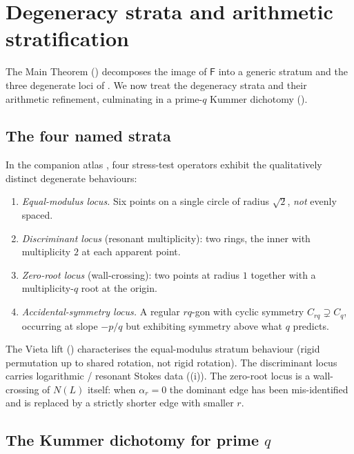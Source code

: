 \documentclass[11pt,a4paper]{article}
\theoremstyle{plain}
\theoremstyle{definition}
\theoremstyle{remark}
\newcommand{\NL}{N(L)}
\newcommand{\Fclass}{\mathsf{F}}
\begin{document}
\section{Degeneracy strata and arithmetic stratification}\label{sec:degeneracy}

The Main Theorem () decomposes the image of $\Fclass$
into a generic stratum and the three degenerate loci of
. We now treat the degeneracy strata and their
arithmetic refinement, culminating in a prime-$q$ Kummer dichotomy
().

\subsection{The four named strata}\label{ssec:strata-named}

In the companion atlas \cite{wkb_dataset_v1}, four stress-test operators
exhibit the qualitatively distinct degenerate behaviours:
\begin{enumerate}[leftmargin=2em]
\item \emph{Equal-modulus locus.} Six points on a single circle of
      radius $\sqrt{2}$, \emph{not} evenly spaced.
\item \emph{Discriminant locus} (resonant multiplicity): two rings, the
      inner with multiplicity $2$ at each apparent point.
\item \emph{Zero-root locus} (wall-crossing): two points at radius $1$
      together with a multiplicity-$q$ root at the origin.
\item \emph{Accidental-symmetry locus.} A regular $rq$-gon with cyclic
      symmetry $C_{rq} \supsetneq C_q$, occurring at slope $-p/q$ but
      exhibiting symmetry above what $q$ predicts.
\end{enumerate}
The Vieta lift () characterises the equal-modulus stratum
behaviour (rigid permutation up to shared rotation, not rigid rotation).
The discriminant locus carries logarithmic / resonant Stokes data
((i)). The zero-root locus is a wall-crossing of
$\NL$ itself: when $\alpha_r = 0$ the dominant edge has been mis-identified
and is replaced by a strictly shorter edge with smaller $r$.

\subsection{\texorpdfstring{The Kummer dichotomy for prime $q$}{The Kummer dichotomy for prime q}}\label{ssec:D2}
\end{document}
